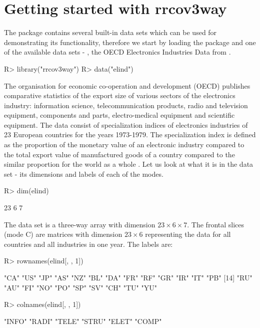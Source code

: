 \documentclass[article,shortnames, nojss]{jss}
\begin{document}
\section{Getting started with rrcov3way}
\label{sec:ex-intro}
The package  contains several built-in data sets which
can be used for demonstrating its functionality, therefore we start
by loading the package and one of the available data sets - ,
the OECD Electronics Industries Data from \cite{kroonenberg:2008}.
\begin{Schunk}
\begin{Sinput}
R> library("rrcov3way")
R> data("elind")
\end{Sinput}
\end{Schunk}
The organisation for economic co-operation and development (OECD) publishes comparative statistics of the export size of various sectors of the electronics industry: information science, telecommunication products, radio and television equipment, components and parts, electro-medical equipment and scientific equipment.
The data consist of specialization indices of electronics industries of 23 European countries for the years 1973-1979. The specialization index is defined as the proportion of the monetary value of an electronic industry compared to the total export value of manufactured goods of a country compared to the similar proportion for the world as a whole \citep[see][]{elind}.
Let us look at what it is in the data set - its dimensions and labels of each of the modes.
\begin{Schunk}
\begin{Sinput}
R> dim(elind)
\end{Sinput}
\begin{Soutput}
[1] 23  6  7
\end{Soutput}
\end{Schunk}
The data set is a three-way array with dimension $23 \times6 \times 7$.
The frontal slices (mode C) are matrices with dimension $23 \times 6$
representing the data for all countries and all industries in one year.
The labels are:
\begin{Schunk}
\begin{Sinput}
R> rownames(elind[, , 1])
\end{Sinput}
\begin{Soutput}
 [1] "CA" "US" "JP" "AS" "NZ" "BL" "DA" "FR" "RF" "GR" "IR" "IT" "PB"
[14] "RU" "AU" "FI" "NO" "PO" "SP" "SV" "CH" "TU" "YU"
\end{Soutput}
\begin{Sinput}
R> colnames(elind[, , 1])
\end{Sinput}
\begin{Soutput}
[1] "INFO" "RADI" "TELE" "STRU" "ELET" "COMP"
\end{Soutput}
\end{Schunk}
\end{document}
